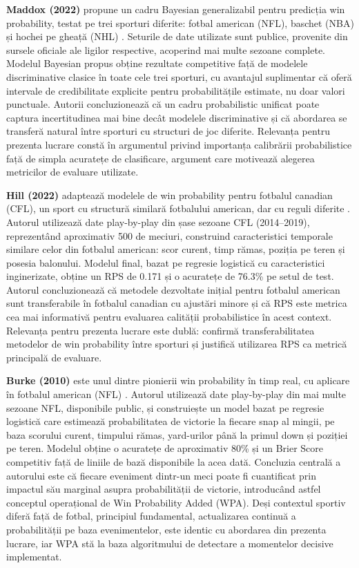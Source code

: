 \textbf{Maddox (2022)} propune un cadru Bayesian generalizabil pentru
predicția win probability, testat pe trei sporturi diferite: fotbal
american (NFL), baschet (NBA) și hochei pe gheață (NHL)
\cite{Maddox2022}. Seturile de date utilizate sunt publice, provenite
din sursele oficiale ale ligilor respective, acoperind mai multe sezoane
complete. Modelul Bayesian propus obține rezultate competitive față de
modelele discriminative clasice în toate cele trei sporturi, cu avantajul
suplimentar că oferă intervale de credibilitate explicite pentru
probabilitățile estimate, nu doar valori punctuale. Autorii concluzionează
că un cadru probabilistic unificat poate captura incertitudinea mai bine
decât modelele discriminative și că abordarea se transferă natural între
sporturi cu structuri de joc diferite. Relevanța pentru prezenta lucrare
constă în argumentul privind importanța calibrării probabilistice față de
simpla acuratețe de clasificare, argument care motivează alegerea metricilor
de evaluare utilizate.

\textbf{Hill (2022)} adaptează modelele de win probability pentru fotbalul
canadian (CFL), un sport cu structură similară fotbalului american, dar cu
reguli diferite \cite{Hill2022}. Autorul utilizează date play-by-play
din șase sezoane CFL (2014--2019), reprezentând aproximativ 500 de meciuri,
construind caracteristici temporale similare celor din fotbalul american:
scor curent, timp rămas, poziția pe teren și posesia balonului. Modelul
final, bazat pe regresie logistică cu caracteristici inginerizate, obține
un RPS de
0.171 și o acuratețe de 76.3\% pe setul de test. Autorul concluzionează
că metodele dezvoltate inițial pentru fotbalul american sunt transferabile
în fotbalul canadian cu ajustări minore și că RPS este metrica cea mai
informativă pentru evaluarea calității probabilistice în acest context.
Relevanța pentru prezenta lucrare este dublă: confirmă transferabilitatea
metodelor de win probability între sporturi și justifică utilizarea RPS
ca metrică principală de evaluare.

\textbf{Burke (2010)} este unul dintre pionierii win probability în timp
real, cu aplicare în fotbalul american (NFL) \cite{Burke2010}. Autorul
utilizează date play-by-play din mai multe sezoane NFL, disponibile public,
și construiește un model bazat pe regresie logistică care estimează
probabilitatea de victorie la fiecare snap al mingii, pe baza scorului
curent, timpului rămas, yard-urilor până la primul down și poziției pe
teren. Modelul obține o acuratețe de aproximativ 80\% și un Brier Score
competitiv față de liniile de bază disponibile la acea dată. Concluzia
centrală a autorului este că fiecare eveniment dintr-un meci poate fi
cuantificat prin impactul său marginal asupra probabilității de victorie,
introducând astfel conceptul operațional de Win Probability Added (WPA).
Deși contextul sportiv diferă față de fotbal, principiul fundamental,
actualizarea continuă a probabilității pe baza evenimentelor, este
identic cu abordarea din prezenta lucrare, iar WPA stă la baza
algoritmului de detectare a momentelor decisive implementat.

